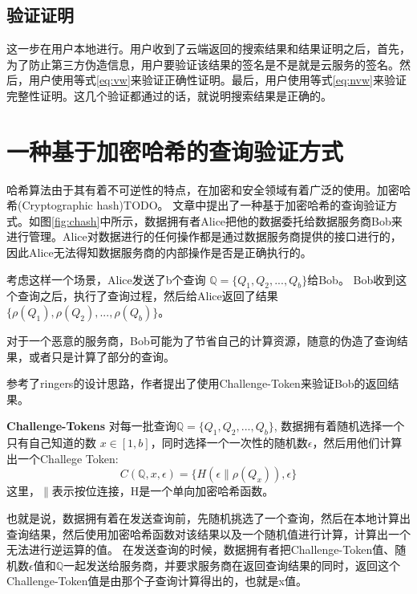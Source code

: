 \subsection{验证证明}
这一步在用户本地进行。用户收到了云端返回的搜索结果和结果证明之后，首先，为了防止第三方伪造信息，用户要验证该结果的签名是不是就是云服务的签名。然后，用户使用等式\ref{eq:vw}来验证正确性证明。最后，用户使用等式\ref{eq:nvw}来验证完整性证明。这几个验证都通过的话，就说明搜索结果是正确的。

\section{一种基于加密哈希的查询验证方式}
哈希算法由于其有着不可逆性的特点，在加密和安全领域有着广泛的使用。加密哈希(Cryptographic hash)\cite{CHash}TODO。
文章\cite{sion2005query}中提出了一种基于加密哈希的查询验证方式。如图\ref{fig:chash}中所示，数据拥有者Alice把他的数据委托给数据服务商Bob来进行管理。Alice对数据进行的任何操作都是通过数据服务商提供的接口进行的，因此Alice无法得知数据服务商的内部操作是否是正确执行的。

考虑这样一个场景，Alice发送了b个查询 $\mathbb{Q} = \{Q_1, Q_2, ... ,Q_b\}$给Bob。
Bob收到这个查询之后，执行了查询过程，然后给Alice返回了结果$\{\rho(Q_1), \rho(Q_2), ..., \rho(Q_b)\}$。

对于一个恶意的服务商，Bob可能为了节省自己的计算资源，随意的伪造了查询结果，或者只是计算了部分的查询。

参考了ringers\cite{golle2001uncheatable}的设计思路，作者提出了使用Challenge-Token来验证Bob的返回结果。

\textbf{Challenge-Tokens} 对每一批查询$\mathbb{Q} = \{Q_1, Q_2, ... ,Q_b\}$, 数据拥有着随机选择一个只有自己知道的数 $x \in [1, b]$，同时选择一个一次性的随机数$\epsilon$，然后用他们计算出一个Challege Token:
\begin{equation} C(\mathbb{Q}, x, \epsilon) = \{H(\epsilon \parallel \rho(Q_x)), \epsilon\}\end{equation}
这里，$\parallel$表示按位连接，H是一个单向加密哈希函数。

也就是说，数据拥有着在发送查询前，先随机挑选了一个查询，然后在本地计算出查询结果，然后使用加密哈希函数对该结果以及一个随机值进行计算，计算出一个无法进行逆运算的值。
在发送查询的时候，数据拥有者把Challenge-Token值、随机数$\epsilon$值和$\mathbb{Q}$一起发送给服务商，并要求服务商在返回查询结果的同时，返回这个Challenge-Token值是由那个子查询计算得出的，也就是x值。

